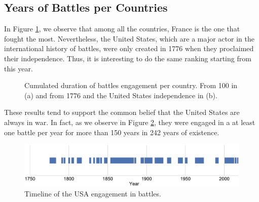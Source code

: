 \subsection{Years of Battles per Countries}
In Figure \ref{fig:FightingDurationRanking}, we observe that among all the countries, France is the one that fought the most. Nevertheless, the United States, which are a major actor in the international history of battles, were only created in 1776 when they proclaimed their independence. Thus, it is interesting to do the same ranking starting from this year. 
 \begin{figure}[h]
	\hspace{-0.4 em}
	\vspace{-0.1 em}
	\caption{Cumulated duration of battles engagement per country. From 100 in (a) and from 1776 and the United States independence in (b).} 
	\label{fig:FightingDurationRanking}
\end{figure}
 These results tend to support the common belief that the United States are always in war. In fact, as we observe in Figure \ref{fig:USAFightingTimeline}, they were engaged in a at least one battle per year for more than 150 years in 242 years of existence.
 \begin{figure}[h]
 	\centering	\includegraphics[width=\linewidth]{figures/USAFighting}
 	\caption{Timeline of the USA engagement in battles.}\label{fig:USAFightingTimeline}
 	\centering
 \end{figure}

